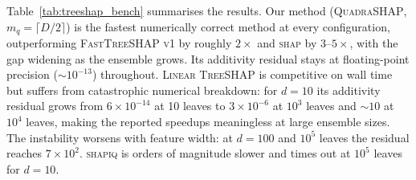 \documentclass{article}
\begin{document}
Table~\ref{tab:treeshap_bench} summarises the results.
Our method (\textsc{QuadraSHAP}, $m_q{=}\lceil D/2\rceil$) is the fastest
numerically correct method at every configuration, outperforming
\textsc{FastTreeSHAP v1} by roughly $2{\times}$ and \textsc{shap} by
$3$--$5{\times}$, with the gap widening as the ensemble grows.
Its additivity residual stays at floating-point precision (${\sim}10^{-13}$)
throughout.
\textsc{Linear TreeSHAP} is competitive on wall time but suffers from
catastrophic numerical breakdown: for $d{=}10$ its additivity residual
grows from $6{\times}10^{-14}$ at 10 leaves to $3{\times}10^{-6}$ at $10^3$
leaves and ${\sim}10$ at $10^4$ leaves, making the reported speedups
meaningless at large ensemble sizes.
The instability worsens with feature width: at $d{=}100$ and $10^5$
leaves the residual reaches $7{\times}10^2$.
\textsc{shapiq} is orders of magnitude slower and times out at $10^5$
leaves for $d{=}10$.
\end{document}
